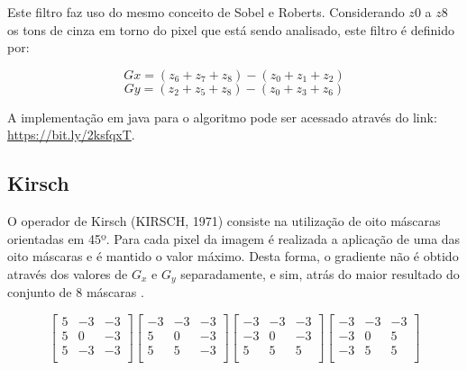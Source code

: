 \documentclass[
	12pt,				%
	oneside,			%
	a4paper,			%
	english,			%
	french,				%
	spanish,			%
	brazil,				%
	]{abntex2}
\begin{document}
Este filtro faz uso do mesmo conceito de Sobel e Roberts. Considerando \(z0\) a \(z8\) os tons de cinza em torno do pixel que está sendo analisado, este filtro é definido por:

\[Gx = (z_6 + z_7 + z_8) - (z_0 + z_1 + z_2)\]
\[Gy = (z_2 + z_5 + z_8) - (z_0 + z_3 + z_6)\]

A implementação em java para o algoritmo pode ser acessado através do link: \url{https://bit.ly/2ksfqxT}. 

\subsection{Kirsch}
O operador de Kirsch (KIRSCH, 1971) consiste na utilização de oito máscaras orientadas em 45º. Para cada pixel da imagem é realizada a aplicação de uma das oito máscaras e é mantido o valor máximo. Desta forma, o gradiente não é obtido através dos valores de \(G_x\) e \(G_y\) separadamente, e sim, atrás do maior resultado do conjunto de 8 máscaras \cite{pedriniSchwartz:2008}.

\[
\begin{bmatrix}
     5 & -3 & -3   \\ 
	 5 &  0 & -3   \\ 
	 5 & -3 & -3   \\    
\end{bmatrix} 
\begin{bmatrix}
    -3 & -3 & -3   \\
	 5 &  0 & -3   \\
	 5 &  5 & -3   \\
\end{bmatrix}
\begin{bmatrix}
    -3 & -3 & -3   \\
	-3 &  0 & -3   \\
	 5 &  5 &  5   \\
\end{bmatrix} 
\begin{bmatrix}
    -3 & -3 & -3   \\
	-3 &  0 &  5   \\
	-3 &  5 &  5   \\
\end{bmatrix}
\]
\end{document}
